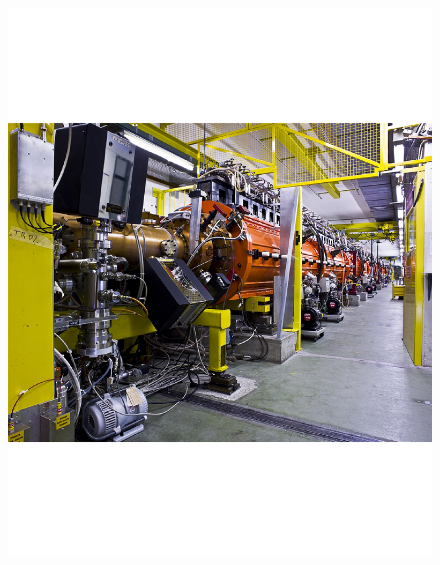\documentclass[
	11pt, %
]{beamer}
\begin{document}
\begin{frame}
\begin{figure}
	\vspace*{-6cm}
	 \hspace*{-7cm}
	\includegraphics[scale=.2]{linac.pdf}
\end{figure}


\end{frame}
\end{document}
